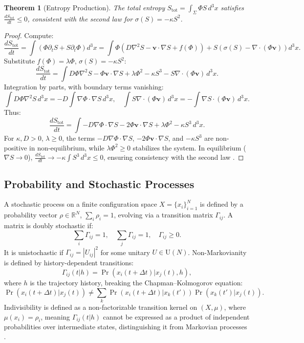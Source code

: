 \documentclass[12pt]{article}
\newtheorem{theorem}{Theorem}
\begin{document}
\begin{theorem}[Entropy Production]
\label{thm:entropy}
The total entropy \(S_{\text{tot}} = \int_\Sigma \Phi S \, d^3x\) satisfies \(\frac{d S_{\text{tot}}}{dt} \leq 0\), consistent with the second law for \(\sigma(S) = -\kappa S^2\).
\end{theorem}

\begin{proof}
Compute:
\[
\frac{d S_{\text{tot}}}{dt} = \int \left( \Phi \partial_t S + S \partial_t \Phi \right) d^3x = \int \Phi \left( D \nabla^2 S - \mathbf{v} \cdot \nabla S + f(\Phi) \right) + S \left( \sigma(S) - \nabla \cdot (\Phi \mathbf{v}) \right) d^3x.
\]
Substitute \(f(\Phi) = \lambda \Phi\), \(\sigma(S) = -\kappa S^2\):
\[
\frac{d S_{\text{tot}}}{dt} = \int D \Phi \nabla^2 S - \Phi \mathbf{v} \cdot \nabla S + \lambda \Phi^2 - \kappa S^3 - S \nabla \cdot (\Phi \mathbf{v}) \, d^3x.
\]
Integration by parts, with boundary terms vanishing:
\[
\int D \Phi \nabla^2 S \, d^3x = -D \int \nabla \Phi \cdot \nabla S \, d^3x, \quad \int S \nabla \cdot (\Phi \mathbf{v}) \, d^3x = -\int \nabla S \cdot (\Phi \mathbf{v}) \, d^3x.
\]
Thus:
\[
\frac{d S_{\text{tot}}}{dt} = \int -D \nabla \Phi \cdot \nabla S - 2 \Phi \mathbf{v} \cdot \nabla S + \lambda \Phi^2 - \kappa S^3 \, d^3x.
\]
For \(\kappa, D > 0\), \(\lambda \geq 0\), the terms \(-D \nabla \Phi \cdot \nabla S\), \(-2 \Phi \mathbf{v} \cdot \nabla S\), and \(-\kappa S^3\) are non-positive in non-equilibrium, while \(\lambda \Phi^2 \geq 0\) stabilizes the system. In equilibrium (\(\nabla S \to 0\)), \(\frac{d S_{\text{tot}}}{dt} \to -\kappa \int S^3 \, d^3x \leq 0\), ensuring consistency with the second law \cite{Seifert2012}.
\end{proof}

\subsection{Probability and Stochastic Processes}

A stochastic process on a finite configuration space \(X = \{x_i\}_{i=1}^N\) is defined by a probability vector \(\rho \in \mathbb{R}^N\), \(\sum_i \rho_i = 1\), evolving via a transition matrix \(\Gamma_{ij}\). A matrix is doubly stochastic if:
\[
\sum_i \Gamma_{ij} = 1, \quad \sum_j \Gamma_{ij} = 1, \quad \Gamma_{ij} \geq 0.
\]
It is unistochastic if \(\Gamma_{ij} = |U_{ij}|^2\) for some unitary \(U \in \mathrm{U}(N)\). Non-Markovianity is defined by history-dependent transitions:
\[
\Gamma_{ij}(t | h) = \Pr(x_i(t + \Delta t) | x_j(t), h),
\]
where \(h\) is the trajectory history, breaking the Chapman–Kolmogorov equation:
\[
\Pr(x_i(t + \Delta t) | x_j(t)) \neq \sum_k \Pr(x_i(t + \Delta t) | x_k(t')) \Pr(x_k(t') | x_j(t)).
\]
Indivisibility is defined as a non-factorizable transition kernel on \((X, \mu)\), where \(\mu(x_i) = \rho_i\), meaning \(\Gamma_{ij}(t | h)\) cannot be expressed as a product of independent probabilities over intermediate states, distinguishing it from Markovian processes \cite{Barandes2023}.
\end{document}
